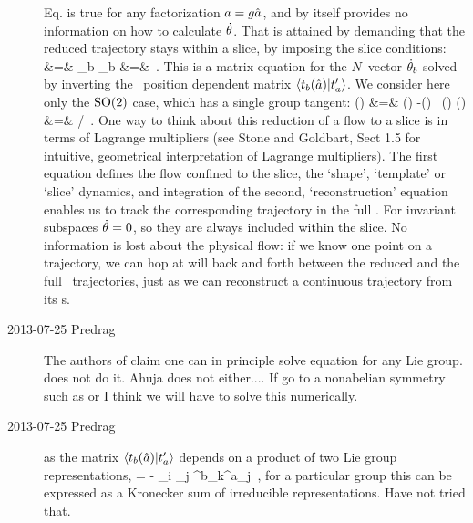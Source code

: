 \begin{description}
Eq.  is true for any factorization
$a=g \hat{a}$, and by itself provides no
information on how to calculate $\dot{\theta}$. That is attained by
demanding that the reduced trajectory stays within a slice, by imposing
the slice conditions: %
\bea
 &=& 
    \continue
\sum_b \dot{\gSpace}_b 
 &=&
\,.
\label{eq:slicecondition}
\eea
This is a matrix equation for the $N$\dmn\ vector $\dot{\theta}_b$ solved
by inverting the \statesp\ position dependent matrix
$\braket{\groupTan_b(\sspRed)}{\sliceTan{a}}$.
We consider here only the
$\textrm{SO}(2)$ case, which has a single group tangent:
\bea
\velRed(\sspRed) &=& \vel(\sspRed)
   -\dot{\gSpace}(\sspRed) \, \groupTan(\sspRed)
\continue
\dot{\gSpace}(\sspRed) &=& {\braket{\vel(\sspRed)}{\sliceTan{}}}/
               {\braket{\groupTan(\sspRed)}{\sliceTan{}}}
\,.
\label{eq:so2reduced1}
\eea
One way to think about this reduction of a flow to a slice is in terms of
Lagrange multipliers (see {Stone and Goldbart}, Sect 1.5 for
intuitive, geometrical interpretation of Lagrange multipliers). The first
equation defines the flow confined to the slice,
the `shape', `template' or `slice' dynamics,
and integration of the second,
`reconstruction' equation enables us to track the
corresponding trajectory in the full \statesp. For invariant subspaces
$\dot{\theta}=0$, so they are always included within the slice. No
information is lost about the physical flow: if we know one point on a
trajectory, we can hop at will back and forth between the reduced
and the full \statesp\ trajectories, just as we can reconstruct a
continuous trajectory from its \PoincSec s.

\item[2013-07-25  Predrag]
The authors of  claim one
can in principle solve equation  for any Lie group.
 does not do it. Ahuja does not either.... If go to a
nonabelian symmetry such as  or  I think we will have to
solve this numerically.

\item[2013-07-25  Predrag] as the matrix
$\braket{\groupTan_b(\sspRed)}{\sliceTan{a}}$ depends on a product of
two Lie group representations,
\beq
{}
 =
 - \sspRed_i \slicep_j \Lg^b_{k\ell}\Lg^a_{\ell j}
\,,
\label{eq:so2reduced2}
\eeq
for a particular group this can be expressed as a Kronecker sum of
irreducible representations. Have not tried that.


\end{description}
